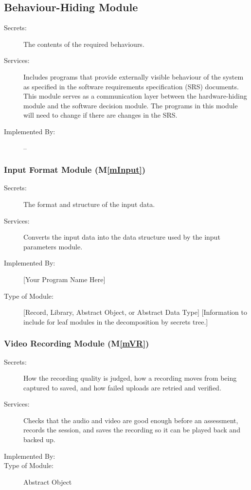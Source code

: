 \documentclass[12pt, titlepage]{article}
\newcommand{\mref}[1]{M\ref{#1}}
\begin{document}
\subsection{Behaviour-Hiding Module}

\begin{description}
\item[Secrets:]The contents of the required behaviours.
\item[Services:]Includes programs that provide externally visible behaviour of
  the system as specified in the software requirements specification (SRS)
  documents. This module serves as a communication layer between the
  hardware-hiding module and the software decision module. The programs in this
  module will need to change if there are changes in the SRS.
\item[Implemented By:] --
\end{description}





\subsubsection{Input Format Module (\mref{mInput})}

\begin{description} %
\item[Secrets:]The format and structure of the input data.
\item[Services:]Converts the input data into the data structure used by the
  input parameters module.
\item[Implemented By:] [Your Program Name Here]
\item[Type of Module:] [Record, Library, Abstract Object, or Abstract Data Type]
  [Information to include for leaf modules in the decomposition by secrets tree.]
\end{description}

\subsubsection{Video Recording Module (\mref{mVR})}
\begin{description}
\item[Secrets:]How the recording quality is judged, how a recording moves from being captured to saved, and how failed uploads are retried and verified.
\item[Services:]Checks that the audio and video are good enough before an assessment, records the session, and saves the recording so it can be played back and backed up.
\item[Implemented By:] \progname{}
\item[Type of Module:] Abstract Object
\end{description}
\end{document}
